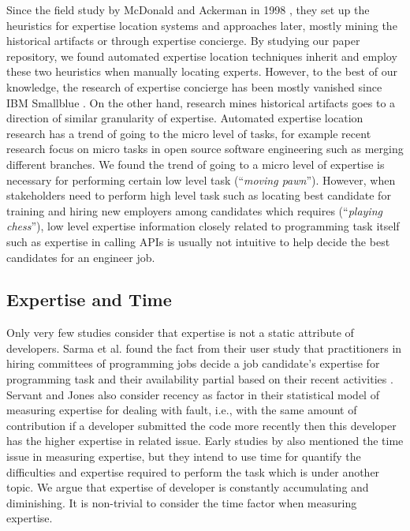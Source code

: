 Since the field study by McDonald and Ackerman in 1998 \cite{mcdonald1998just}, they set up the heuristics for expertise location systems and approaches later, mostly mining the historical artifacts or through expertise concierge. By studying our paper repository, we found automated expertise location techniques inherit and employ these two heuristics when manually locating experts. However, to the best of our knowledge, the research of expertise concierge has been mostly vanished since IBM Smallblue \cite{lin2009smallblue}. On the other hand, research mines historical artifacts goes to a direction of similar granularity of expertise. Automated expertise location research has a trend of going to the micro level of tasks, for example recent research \cite{yu2016reviewer, costa2016tipmerge} focus on micro tasks in open source software engineering such as merging different branches. We found the trend of going to a micro level of expertise is necessary for performing certain low level task (``\textit{moving pawn}''). However, when stakeholders need to perform high level task such as locating best candidate for training and hiring new employers among candidates which requires  (``\textit{playing chess}''), low level expertise information closely related to programming task itself such as expertise in calling APIs is usually not intuitive to help decide the best candidates for an engineer job.

\subsection{Expertise and Time}

Only very few studies consider that expertise is not a static attribute of developers. Sarma et al. found the fact from their user study that practitioners in hiring committees of programming jobs decide a job candidate's expertise for programming task and their availability partial based on their recent activities \cite{hiring2016sarma}. Servant and Jones also consider recency as factor in their statistical model of measuring expertise for dealing with fault, i.e., with the same amount of contribution if a developer submitted the code more recently then this developer has the higher expertise in related issue. Early studies by \cite{mockus2002expertise} also mentioned the time issue in measuring expertise, but they intend to use time for quantify the difficulties and expertise required to perform the task which is under another topic. We argue that expertise of developer is constantly accumulating and diminishing. It is non-trivial to consider the time factor when measuring expertise.

